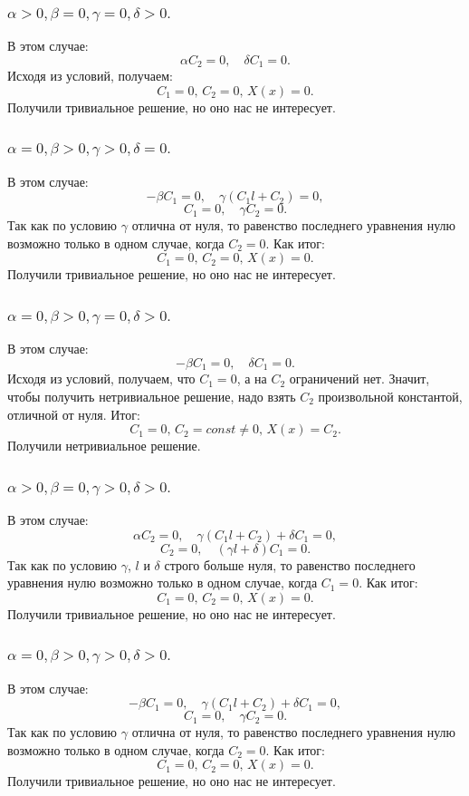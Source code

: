 \documentclass[12pt, a4paper]{report}
\begin{document}
\subsubsection{ $ \alpha > 0, \beta = 0, \gamma = 0, \delta > 0. $}
В этом случае:
\[\alpha C_{2} = 0, \quad \delta C_{1} = 0. \]
Исходя из условий, получаем:
\[ C_{1} = 0, \, C_{2} = 0, \, X(x) = 0. \]
Получили тривиальное решение, но оно нас не интересует.

\subsubsection{ $ \alpha = 0, \beta > 0, \gamma > 0, \delta = 0. $}
В этом случае:
\[ - \beta C_{1} = 0, \quad \gamma (C_{1} l + C_{2}) = 0, \]
\[ C_{1} = 0, \quad \gamma C_{2} = 0. \]
Так как по условию $\gamma$ отлична от нуля, то равенство последнего уравнения нулю возможно только в одном случае, когда $C_{2} = 0$. Как итог:
\[ C_{1} = 0, \, C_{2} = 0, \, X(x) = 0. \]
Получили тривиальное решение, но оно нас не интересует.

\subsubsection{ $ \alpha = 0, \beta > 0, \gamma = 0, \delta > 0. $}
В этом случае:
\[-\beta C_{1} = 0, \quad \delta C_{1} = 0. \]
Исходя из условий, получаем, что $C_{1} = 0$, а на $C_{2}$ ограничений нет. Значит, чтобы получить нетривиальное решение, надо взять $C_{2}$ произвольной константой, отличной от нуля. Итог:
\[ C_{1} = 0, \, C_{2} = const \neq 0, \, X(x) = C_{2}. \]
Получили нетривиальное решение.

\subsubsection{ $ \alpha > 0, \beta = 0, \gamma > 0, \delta > 0. $}
В этом случае:
\[ \alpha C_{2} = 0, \quad \gamma (C_{1} l + C_{2}) + \delta C_{1} = 0, \]
\[ C_{2} = 0, \quad (\gamma l + \delta) C_{1} = 0. \]
Так как по условию $\gamma$, $l$ и $\delta$ строго больше нуля, то равенство последнего уравнения нулю возможно только в одном случае, когда $C_{1} = 0$. Как итог:
\[ C_{1} = 0, \, C_{2} = 0, \, X(x) = 0. \]
Получили тривиальное решение, но оно нас не интересует.

\subsubsection{ $ \alpha = 0, \beta > 0, \gamma > 0, \delta > 0. $}
В этом случае:
\[ - \beta C_{1} = 0, \quad \gamma (C_{1} l + C_{2}) + \delta C_{1} = 0, \]
\[ C_{1} = 0, \quad \gamma C_{2} = 0. \]
Так как по условию $\gamma$ отлична от нуля, то равенство последнего уравнения нулю возможно только в одном случае, когда $C_{2} = 0$. Как итог:
\[ C_{1} = 0, \, C_{2} = 0, \, X(x) = 0. \]
Получили тривиальное решение, но оно нас не интересует.
\end{document}
